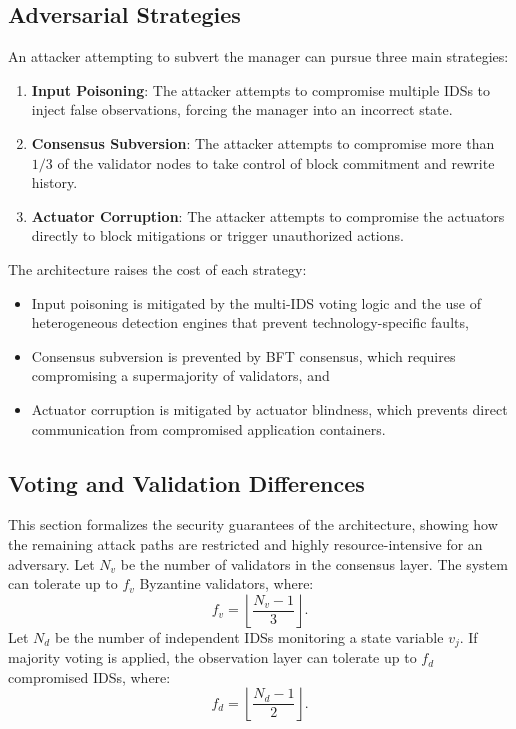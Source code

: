 \subsection{Adversarial Strategies}
\label{subsec:adversarial_strategies}

An attacker attempting to subvert the manager can pursue three main strategies:
\begin{enumerate}
    \item \textbf{Input Poisoning}: The attacker attempts to compromise multiple IDSs to inject false observations, forcing the manager into an incorrect state.
    \item \textbf{Consensus Subversion}: The attacker attempts to compromise more than $1/3$ of the validator nodes to take control of block commitment and rewrite history.
    \item \textbf{Actuator Corruption}: The attacker attempts to compromise the actuators directly to block mitigations or trigger unauthorized actions.
\end{enumerate}

The architecture raises the cost of each strategy:
\begin{itemize}
    \item Input poisoning is mitigated by the multi-IDS voting logic and the use of heterogeneous detection engines that prevent technology-specific faults,
    \item Consensus subversion is prevented by BFT consensus, which requires compromising a supermajority of validators, and
    \item Actuator corruption is mitigated by actuator blindness, which prevents direct communication from compromised application containers.
\end{itemize}


\subsection{Voting and Validation Differences}
\label{subsec:two_layer_fault_tolerance}
This section formalizes the security guarantees of the architecture, showing how the remaining attack paths are restricted and highly resource-intensive for an adversary.
Let $N_v$ be the number of validators in the consensus layer. The system can tolerate up to $f_v$ Byzantine validators, where:
\[
f_v = \left\lfloor \frac{N_v - 1}{3} \right\rfloor.
\]
Let $N_d$ be the number of independent IDSs monitoring a state variable $v_j$. If majority voting is applied, the observation layer can tolerate up to $f_d$ compromised IDSs, where:
\[
f_d = \left\lfloor \frac{N_d - 1}{2} \right\rfloor.
\]

